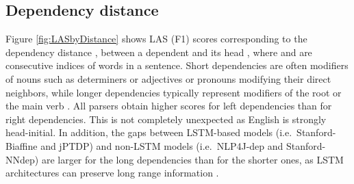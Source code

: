 \documentclass[twocolumn,hyperref]{bmcart}\pdfoutput=1
\newcommand{\CHANGEA}[1]{#1}
\begin{document}
\subsection*{Dependency distance}

Figure \ref{fig:LASbyDistance}  shows LAS (F1) scores corresponding to  the dependency distance , between a dependent  and its head , where  and  are consecutive indices of words in a sentence.  Short dependencies are often modifiers of nouns such
as determiners or adjectives or pronouns modifying their direct neighbors, while longer  dependencies typically represent modifiers of the root or the main verb   \cite{mcdonald-nivre:2007:EMNLP-CoNLL2007}.
All parsers obtain higher scores for left dependencies than  for  right dependencies. This is not completely  unexpected as English is strongly head-initial. 
In addition, the gaps between LSTM-based models (i.e.\ Stanford-Biaffine and jPTDP) and non-LSTM models (i.e.\ NLP4J-dep and Stanford-NNdep) are larger for the long dependencies than for the shorter ones, as LSTM architectures can preserve long range information \cite{Graves2008}. 




  \begin{table}[!t]
  \caption{\CHANGEA{LAS (F1) scores  of Stanford-Biaffine on GENIA,  by frequent dependency labels in the  left dependencies. ``Prop.'' denotes the occurrence proportion in each distance bin.}}
  \centering
{}
\label{tab:depbylasposjPTDP}
\end{table}
\end{document}

